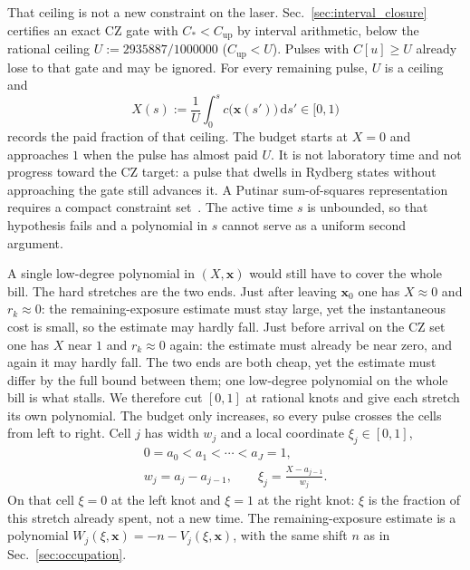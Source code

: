 \documentclass[aps,prx,reprint,nofootinbib,longbibliography,floatfix]{revtex4-2}
\theoremstyle{plain}
\theoremstyle{remark}
\newcommand{\dd}{\mathrm{d}}
\newcommand{\xv}{\boldsymbol{x}}
\begin{document}
That ceiling is not a new constraint on the laser.
Sec.~\ref{sec:interval_closure} certifies an exact CZ gate with
$C_*<C_{\mathrm{up}}$ by interval arithmetic, below the rational ceiling
$U:=2935887/1000000$ ($C_{\mathrm{up}}<U$). Pulses with $C[u]\ge U$ already
lose to that gate and may be ignored. For every remaining pulse, $U$ is a
ceiling and
\begin{equation}
X(s):=\frac1U\int_0^s c\bigl(\xv(s')\bigr)\,\dd s'\in[0,1)
\label{eq:exposure_odometer}
\end{equation}
records the paid fraction of that ceiling. The budget starts at $X=0$ and
approaches $1$ when the pulse has almost paid $U$. It is not laboratory
time and not progress toward the CZ target: a pulse that dwells in Rydberg
states without approaching the gate still advances it. A Putinar
sum-of-squares representation requires a compact constraint
set~\cite{Putinar93}. The active time $s$ is unbounded, so that
hypothesis fails and a polynomial in $s$ cannot serve as a uniform
second argument.

A single low-degree polynomial in $(X,\xv)$ would still have to cover the
whole bill. The hard stretches are the two ends. Just after leaving
$\xv_0$ one has $X\approx0$ and $r_k\approx0$: the remaining-exposure
estimate must stay large, yet the instantaneous cost is small, so the
estimate may hardly fall. Just before arrival on the CZ set one has $X$
near $1$ and $r_k\approx0$ again: the estimate must already be near
zero, and again it may hardly fall. The two ends are both cheap, yet the estimate must differ by the full bound between them; one low-degree polynomial on the whole bill is what stalls. We
therefore cut $[0,1]$ at rational knots and give each stretch its own
polynomial. The budget only increases, so every pulse crosses the cells
from left to right. Cell $j$ has width $w_j$ and a local coordinate
$\xi_j\in[0,1]$,
\begin{equation}
\begin{gathered}
0=a_0<a_1<\cdots<a_J=1,\\
w_j=a_j-a_{j-1},\qquad\xi_j=\frac{X-a_{j-1}}{w_j}.
\end{gathered}
\label{eq:split_grid}
\end{equation}
On that cell $\xi=0$ at the left knot and $\xi=1$ at the right knot:
$\xi$ is the fraction of this stretch already spent, not a new time.
The remaining-exposure estimate is a polynomial
$W_j(\xi,\xv)=-n-V_j(\xi,\xv)$, with the same shift $n$ as in
Sec.~\ref{sec:occupation}.
\end{document}
